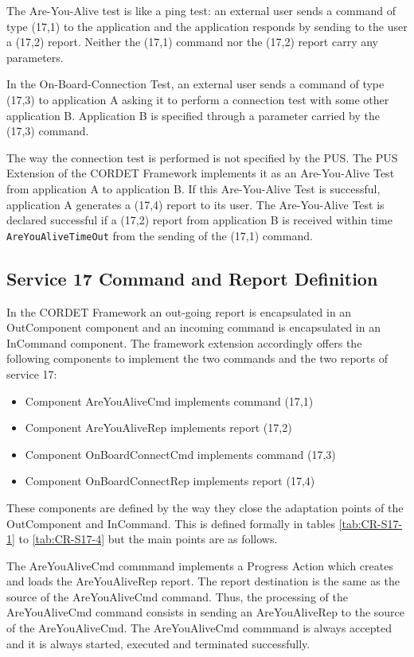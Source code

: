 \documentclass{pnp_article}
\begin{document}
The Are-You-Alive test is like a ping test: an external user sends a command of type (17,1) to the application and the application responds by sending to the user a (17,2) report. Neither the (17,1) command nor the (17,2) report carry any parameters. 

In the On-Board-Connection Test, an external user sends a command of type (17,3) to application A asking it to perform a connection test with some other application B. Application B is specified through a parameter carried by the (17,3) command. 

The way the connection test is performed is not specified by the PUS. The PUS Extension of the CORDET Framework implements it as an Are-You-Alive Test from application A to application B. If this Are-You-Alive Test is successful, application A generates a (17,4) report to its user. The Are-You-Alive Test is declared successful if a (17,2) report from application B is received within time \texttt{AreYouAliveTimeOut} from the sending of the (17,1) command.

\subsection{Service 17 Command and Report Definition}
In the CORDET Framework an out-going report is encapsulated in an OutComponent component and an incoming command is encapsulated in an InCommand component. The framework extension accordingly offers the following components to implement the two commands and the two reports of service 17:

\begin{itemize}
\item Component AreYouAliveCmd implements command (17,1) 
\item Component AreYouAliveRep implements report (17,2) 
\item Component OnBoardConnectCmd implements command (17,3)  
\item Component OnBoardConnectRep implements report (17,4) 
\end{itemize}

These components are defined by the way they close the adaptation points of the OutComponent and InCommand. This is defined formally in tables \ref{tab:CR-S17-1} to \ref{tab:CR-S17-4} but the main points are as follows.

The AreYouAliveCmd commmand implements a Progress Action which creates and loads the AreYouAliveRep report. The report destination is the same as the source of the AreYouAliveCmd command. Thus, the processing of the AreYouAliveCmd command consists in sending an AreYouAliveRep to the source of the AreYouAliveCmd. The AreYouAliveCmd commmand is always accepted and it is always started, executed and terminated successfully.
\end{document}
